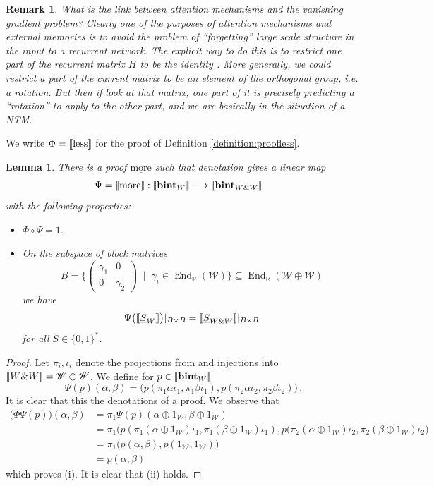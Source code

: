 \documentclass[english,letter paper,12pt,leqno]{article}
\newtheorem{lemma}[theorem]{Lemma}
\theoremstyle{example}
\newtheorem{remark}[theorem]{Remark}
\numberwithin{equation}{section}
\def\be{\begin{equation}}
\def\ee{\end{equation}}
\DeclareMathOperator{\End}{End}
\begin{document}
\begin{remark} What is the link between attention mechanisms and the vanishing gradient problem? Clearly one of the purposes of attention mechanisms and external memories is to avoid the problem of ``forgetting'' large scale structure in the input to a recurrent network. The explicit way to do this is to restrict one part of the recurrent matrix $H$ to be the identity \cite{mikolovmemory}. More generally, we could restrict a part of the current matrix to be an element of the orthogonal group, i.e. a rotation. But then if look at that matrix, one part of it is precisely predicting a ``rotation'' to apply to the other part, and we are basically in the situation of a NTM.
\end{remark}

We write $\Phi = \llbracket \mathrm{less} \rrbracket$ for the proof of Definition \ref{definition:proofless}.

\begin{lemma}\label{lemma:lessmore} There is a proof $\underline{\mathrm{more}}$ such that denotation gives a linear map
\begin{align*}
\Psi &= \llbracket \mathrm{more} \rrbracket: \llbracket \textbf{bint}_{W} \rrbracket \longrightarrow \llbracket \textbf{bint}_{W \& W} \rrbracket
\end{align*}
with the following properties:
\begin{itemize}
\item[(i)] $\Phi \circ \Psi = 1$.
\item[(ii)] On the subspace of block matrices
\[
B = \Bigg\{ \begin{pmatrix} \gamma_1 & 0 \\ 0 & \gamma_2 \end{pmatrix} \;\;\Bigg| \;\; \gamma_i \in \End_{\mathbb{R}}(\mathscr{W}) \Bigg\} \subseteq \End_{\mathbb{R}}( \mathscr{W} \oplus \mathscr{W} )
\]
we have
\be
\Psi\big( \den{\underline{S}_W} \big)|_{B \times B} = \den{\underline{S}_{W \& W}}|_{B \times B}
\ee
for all $S \in \{0,1\}^*$.
\end{itemize}
\end{lemma}
\begin{proof}
Let $\pi_i, \iota_i$ denote the projections from and injections into $\llbracket W \& W \rrbracket = \mathscr{W} \oplus \mathscr{W}$. We define for $p \in \llbracket \textbf{bint}_W \rrbracket$
\[
\Psi( p )( \alpha, \beta ) = \big( p( \pi_1 \alpha \iota_1, \pi_1 \beta \iota_1 ) , p( \pi_2 \alpha \iota_2, \pi_2 \beta \iota_2 ) \big)\,.
\]
It is clear that this the denotations of a proof. We observe that
\begin{align*}
\big( \Phi \Psi(p) \big)(\alpha, \beta) &= \pi_1 \Psi(p)( \alpha \oplus 1_{\mathscr{W}}, \beta \oplus 1_{\mathscr{W}} )\\
&= \pi_1 \Big( p( \pi_1 (\alpha \oplus 1_{\mathscr{W}}) \iota_1, \pi_1(\beta \oplus 1_{\mathscr{W}}) \iota_1 ), p( \pi_2 (\alpha \oplus 1_{\mathscr{W}}) \iota_2, \pi_2(\beta \oplus 1_{\mathscr{W}}) \iota_2 \Big)\\
&= \pi_1 \big( p(\alpha, \beta), p(1_{\mathscr{W}}, 1_{\mathscr{W}}) \big)\\
&= p(\alpha, \beta)
\end{align*}
which proves (i). It is clear that (ii) holds.
\end{proof}
\end{document}
